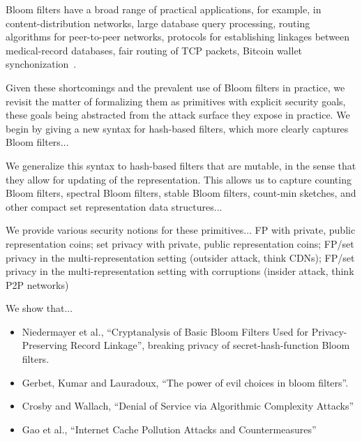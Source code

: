 Bloom filters have a broad range of practical applications, for
example, in content-distribution networks, large database query
processing, routing algorithms for peer-to-peer networks, protocols
for establishing linkages between medical-record databases, fair
routing of TCP packets, Bitcoin wallet synchonization~\cite{schnell2011novel,niedermeyer2014cryptanalysis,gervais2014privacy,nojima2009cryptographically,feng2001stochastic,reynolds2003efficient,byers2002informed,broder2004network}. 

Given these shortcomings and the prevalent use of Bloom filters in practice, we revisit the matter of formalizing them as primitives with explicit security goals, these goals being abstracted from the attack surface they expose in practice.   We begin by giving a new syntax for hash-based filters, which more clearly captures Bloom filters...

We generalize this syntax to hash-based filters that are mutable,
%
in the sense
that they allow for updating of the representation. This allows us
to capture counting Bloom filters, spectral Bloom filters, stable
Bloom filters, count-min sketches, and other compact set
representation data structures...

We provide various security notions for these primitives... FP with private, public representation coins; set privacy with private, public representation coins; FP/set privacy in the multi-representation setting (outsider attack, think CDNs); FP/set privacy in the multi-representation setting with corruptions (insider attack, think P2P networks) 


We show that...

\begin{itemize}
\item Niedermayer et al., ``Cryptanalysis of Basic Bloom Filters Used for Privacy-Preserving Record Linkage'', breaking privacy of secret-hash-function Bloom filters. 
\item Gerbet, Kumar and Lauradoux, ``The power of evil choices in bloom filters''.  
\item Crosby and Wallach, ``Denial of Service via Algorithmic Complexity Attacks'' 
\item Gao et al., ``Internet Cache Pollution Attacks and Countermeasures''
\end{itemize}

